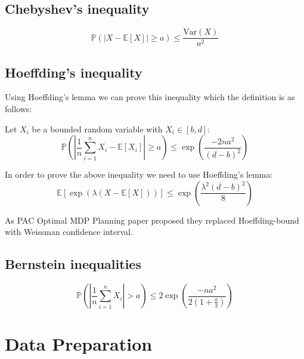 \documentclass[letterpaper,12pt]{article}
\begin{document}
    \subsection{Chebyshev's inequality}
    \begin{equation}
        \mathbb {P}(|X - \mathbb{E}[X]| \geq a ) \leq \frac { \mathrm { Var}( X ) } { a^2 }
    \end{equation}


    \subsection{Hoeffding's inequality}
    Using Hoeffding's lemma we can prove this inequality which the definition is as follows:

    Let $X_i$ be a bounded random variable with $X_i \in [b, d]$:
    \begin{equation}
        \mathbb {P} \left( \left| \frac{1}{n} \sum_{i=1}^{n} X_i - \mathbb{E}[X_i] \right| \geq a \right) \leq { \exp \left( \frac{-2 n a ^ {2} }{ \left(d-b \right) ^ 2} \right) }
    \end{equation}

    In order to prove the above inequality we need to use Hoeffding's lemma:
    \begin{equation}
        \mathbb {E} \left[ \exp \left( {\lambda ( X - \mathbb {E}[X] )} \right)  \right] \leq \exp \left( \frac{\lambda ^ 2 (d-b)^2}{8} \right)
    \end{equation}

    As PAC Optimal MDP Planning paper \cite{AlkaeeTaleghan2015a} proposed they replaced Hoeffding-bound with Weissman confidence interval.

    \subsection{Bernstein inequalities}
    \begin{equation}
        \mathbb { P } \left( \left| \frac { 1 } { n } \sum _ { i = 1 } ^ { n } X _ { i } \right| > a \right) \leq 2 \exp \left( \frac {- n a ^ {2} } { 2 \left( 1 + \frac {a} {3} \right) } \right)
    \end{equation}

    \section{Data Preparation}
\end{document}
